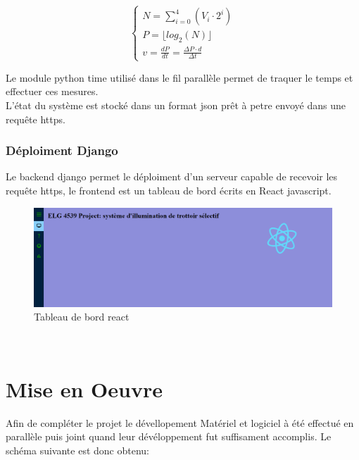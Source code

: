\documentclass[journal]{IEEEtran}
\begin{document}
\begin{equation}\label{eq-2}
    \left\{\begin{aligned}
        N = \sum_{i=0}^{4}(V_i\cdot 2^i) \\
        P =  \lfloor{log_2(N)}\rfloor \\
        v = \frac{dP}{dt} = \frac{\Delta P \cdot d}{\Delta t}
    \end{aligned} \right. 
\end{equation}

Le module python time utilisé dans le fil parallèle permet de traquer le temps et effectuer ces mesures.\\
L'état du système est stocké dans un format json prêt à petre envoyé dans une requête https.

\subsubsection{Déploiment Django}

Le backend django permet le déploiment d'un serveur capable de recevoir les requête https, le frontend est un tableau de bord écrits en React javascript.
\begin{figure}[htbp]
    \centerline{\includegraphics[scale = 0.18]{react_dashboard.PNG}}
    \caption{Tableau de bord react}
    \label{fig6}
\end{figure} 
\\

\section{Mise en Oeuvre}
Afin de compléter le projet le dévellopement Matériel et logiciel à été effectué en parallèle puis joint quand leur dévéloppement fut suffisament accomplis. Le schéma suivante
est donc obtenu:
\end{document}
